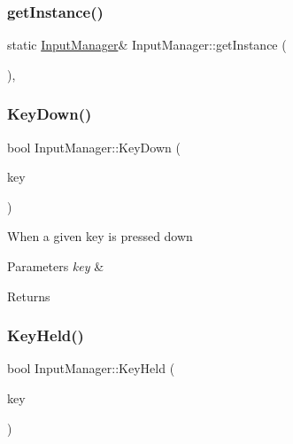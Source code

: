 \subsubsection{\texorpdfstring{get\+Instance()}{getInstance()}}
{\footnotesize\ttfamily static \mbox{\hyperlink{class_input_manager}{Input\+Manager}}\& Input\+Manager\+::get\+Instance (\begin{DoxyParamCaption}{ }\end{DoxyParamCaption})\hspace{0.3cm}{\ttfamily [inline]}, {\ttfamily [static]}}

\mbox{\label{class_input_manager_ab506676fb41f532dd3e204eea13b44bc}} 
\subsubsection{\texorpdfstring{Key\+Down()}{KeyDown()}}
{\footnotesize\ttfamily bool Input\+Manager\+::\+Key\+Down (\begin{DoxyParamCaption}\item[{S\+D\+L\+\_\+\+Keycode}]{key }\end{DoxyParamCaption})}



When a given key is pressed down 


\begin{DoxyParams}{Parameters}
{\em key} & \\
\hline
\end{DoxyParams}
\begin{DoxyReturn}{Returns}

\end{DoxyReturn}
\mbox{\label{class_input_manager_af0d58a0ae0e6cc0ad9205d3bb3b3f8fe}} 
\subsubsection{\texorpdfstring{Key\+Held()}{KeyHeld()}}
{\footnotesize\ttfamily bool Input\+Manager\+::\+Key\+Held (\begin{DoxyParamCaption}\item[{S\+D\+L\+\_\+\+Keycode}]{key }\end{DoxyParamCaption})}



